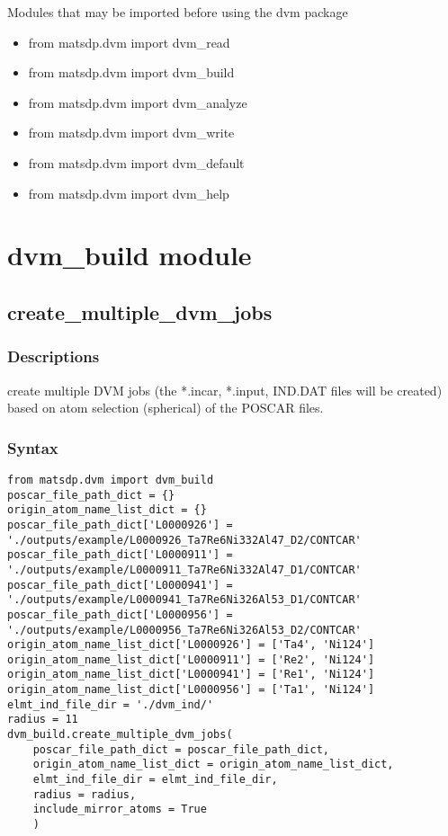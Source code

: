 \documentclass[12pt]{book}
\begin{document}
Modules that may be imported before using the dvm package
\begin{itemize}
\item from matsdp.dvm import dvm\_read
\item from matsdp.dvm import dvm\_build
\item from matsdp.dvm import dvm\_analyze
\item from matsdp.dvm import dvm\_write
\item from matsdp.dvm import dvm\_default
\item from matsdp.dvm import dvm\_help
\end{itemize}

\section{dvm\_build module}
\subsection{create\_multiple\_dvm\_jobs}
\subsubsection{Descriptions}
create multiple DVM jobs (the *.incar, *.input, IND.DAT files will be created) based on atom selection (spherical) of the POSCAR files.
 
\subsubsection{Syntax}
\begin{lstlisting}
from matsdp.dvm import dvm_build
poscar_file_path_dict = {}
origin_atom_name_list_dict = {}
poscar_file_path_dict['L0000926'] = './outputs/example/L0000926_Ta7Re6Ni332Al47_D2/CONTCAR'
poscar_file_path_dict['L0000911'] = './outputs/example/L0000911_Ta7Re6Ni332Al47_D1/CONTCAR'
poscar_file_path_dict['L0000941'] = './outputs/example/L0000941_Ta7Re6Ni326Al53_D1/CONTCAR'
poscar_file_path_dict['L0000956'] =  './outputs/example/L0000956_Ta7Re6Ni326Al53_D2/CONTCAR'
origin_atom_name_list_dict['L0000926'] = ['Ta4', 'Ni124']
origin_atom_name_list_dict['L0000911'] = ['Re2', 'Ni124']
origin_atom_name_list_dict['L0000941'] = ['Re1', 'Ni124']
origin_atom_name_list_dict['L0000956'] = ['Ta1', 'Ni124']
elmt_ind_file_dir = './dvm_ind/'
radius = 11
dvm_build.create_multiple_dvm_jobs(
    poscar_file_path_dict = poscar_file_path_dict,
    origin_atom_name_list_dict = origin_atom_name_list_dict,
    elmt_ind_file_dir = elmt_ind_file_dir,
    radius = radius,
    include_mirror_atoms = True
    )
\end{lstlisting}
\end{document}
